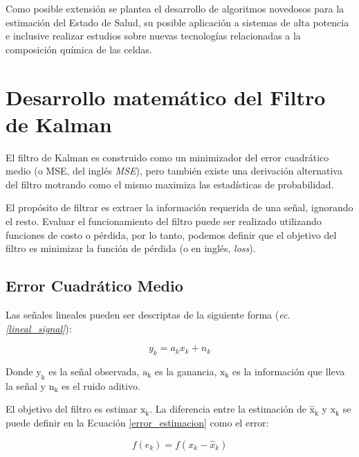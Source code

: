 \documentclass[10pt, a4paper]{article}
\begin{document}
Como posible extensión se plantea el desarrollo de algoritmos novedosos para la
estimación del Estado de Salud, su posible aplicación a sistemas de alta
potencia e inclusive realizar estudios sobre nuevas tecnologías relacionadas a
la composición química de las celdas.

\newpage

\printbibliography[heading=bibintoc]

\newpage

\appendix 

\section{Desarrollo matem\'atico del Filtro de Kalman}\label{matKalman}

\noindent El filtro de Kalman es construido como un minimizador del error 
cuadr\'atico medio (o \acrshort{MSE}, del ingl\'es 
\emph{\acrlong{MSE}}), pero tambi\'en existe una derivaci\'on 
alternativa del filtro motrando como el mismo maximiza las estad\'isticas de 
probabilidad.

\noindent El prop\'osito de filtrar es extraer la informaci\'on requerida de una
señal, ignorando el resto. Evaluar el funcionamiento del filtro puede ser
realizado utilizando funciones de costo o p\'erdida, por lo tanto, podemos
definir que el objetivo del filtro es minimizar la funci\'on de p\'erdida (o en
ingl\'es, \emph{loss}).

\subsection{Error Cuadr\'atico Medio}

\noindent Las señales lineales pueden ser descriptas de la siguiente forma
(\emph{ec.\ref{lineal_signal}}):

\begin{equation}
    y_k = a_k x_k + n_k \label{lineal_signal}
\end{equation}

\noindent Donde $\mathrm{y_k}$ es la señal observada, $\mathrm{a_k}$ es la 
ganancia, $\mathrm{x_k}$ es la informaci\'on que lleva la señal y $\mathrm{n_k}$ 
es el ruido aditivo.

\noindent El objetivo del filtro es estimar $\mathrm{x_k}$. La diferencia entre
la estimaci\'on de $\mathrm{\hat{x}_k}$ y $\mathrm{x_k}$ se puede definir en la
Ecuaci\'on \ref{error_estimacion} como el error:

\begin{equation}
    f(e_k) = f(x_k - \hat{x}_k) \label{error_estimacion}
\end{equation}
\end{document}
